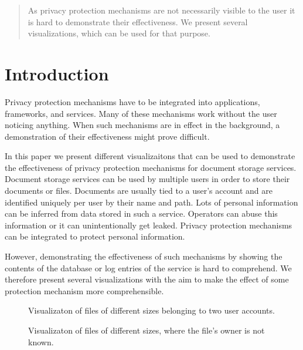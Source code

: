 \begin{abstract}
	As privacy protection mechanisms are not necessarily visible to the user it is hard to demonstrate their effectiveness.
	We present several visualizations, which can be used for that purpose.
\end{abstract}

\section{Introduction}
Privacy protection mechanisms have to be integrated into applications, frameworks, and services.
Many of these mechanisms work without the user noticing anything.
When such mechanisms are in effect in the background, a demonstration of their effectiveness might prove difficult.

In this paper we present different visualizaitons that can be used to demonstrate the effectiveness of privacy protection mechanisms for document storage services.
Document storage services can be used by multiple users in order to store their documents or files.
Documents are usually tied to a user's account and are identified uniquely per user by their name and path.
Lots of personal information can be inferred from data stored in such a service.
Operators can abuse this information or it can unintentionally get leaked.
Privacy protection mechanisms can be integrated to protect personal information.

However, demonstrating the effectiveness of such mechanisms by showing the contents of the database or log entries of the service is hard to comprehend.
We therefore present several visualizations with the aim to make the effect of some protection mechanism more comprehensible.

\begin{figure*}[ht]
	\centering
	
	\caption{Visualizaton of files of different sizes belonging to two user accounts.}%
	\label{fig:metadata-treemap}
\end{figure*}

\begin{figure*}[ht]
	\centering
	
	\caption{Visualizaton of files of different sizes, where the file's owner is not known.}%
	\label{fig:filesonly-treemap}
\end{figure*}

